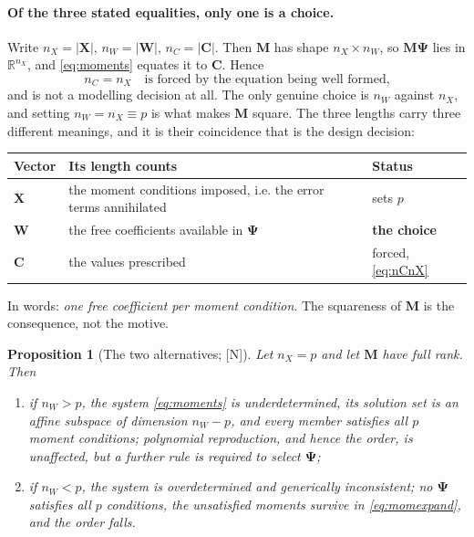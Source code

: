 \documentclass[11pt,a4paper]{article}
\newcommand{\New}{\textcolor{blue!60!black}{\textsf{[N]}}}
\newtheorem{proposition}{Proposition}
\begin{document}
\paragraph{Of the three stated equalities, only one is a choice.} Write
$n_X=|\bm X|$, $n_W=|\bm W|$, $n_C=|\bm C|$. Then $\bm M$ has shape $n_X\times n_W$,
so $\bm M\bm\Psi$ lies in $\mathbb R^{n_X}$, and \eqref{eq:moments} equates it to
$\bm C$. Hence
\begin{equation}
n_C=n_X\quad\text{is forced by the equation being well formed,}
\label{eq:nCnX}
\end{equation}
and is not a modelling decision at all. The only genuine choice is $n_W$ against $n_X$,
and setting $n_W=n_X\equiv p$ is what makes $\bm M$ square. The three lengths carry
three different meanings, and it is their coincidence that is the design decision:
\begin{center}
\begin{tabular}{@{}lll@{}}
\toprule
Vector & Its length counts & Status \\
\midrule
$\bm X$ & the moment conditions imposed, i.e. the error terms annihilated & sets $p$ \\
$\bm W$ & the free coefficients available in $\bm\Psi$ & \textbf{the choice} \\
$\bm C$ & the values prescribed & forced, \eqref{eq:nCnX} \\
\bottomrule
\end{tabular}
\end{center}
\noindent In words: \emph{one free coefficient per moment condition}. The squareness of
$\bm M$ is the consequence, not the motive.

\begin{proposition}[The two alternatives; \New]
\label{prop:dims}
Let $n_X=p$ and let $\bm M$ have full rank. Then
\begin{enumerate}[label=(\roman*)]
\item if $n_W>p$, the system \eqref{eq:moments} is underdetermined, its solution set is
an affine subspace of dimension $n_W-p$, and \emph{every} member satisfies all $p$
moment conditions; polynomial reproduction, and hence the order, is unaffected, but a
further rule is required to select $\bm\Psi$;
\item if $n_W<p$, the system is overdetermined and generically inconsistent; no
$\bm\Psi$ satisfies all $p$ conditions, the unsatisfied moments survive in
\eqref{eq:momexpand}, and the order falls.
\end{enumerate}
\end{proposition}
\end{document}
